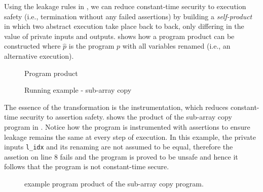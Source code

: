 
Using the leakage rules in , 
we can reduce constant-time security to execution safety (i.e., termination
without any failed assertions) by building a \emph{self-product} in which two
abstract execution take place back to back, only differing in the value of
private inputs and outputs.  shows how a program product can
be constructed where $\hat{p}$ is the program $p$ with all variables renamed
(i.e., an alternative execution).

\begin{figure}[h]
    \centering
    \label{fig:fig_7}
    \label{fig:fig_8}
    \caption{Program product}
    \label{fig:rules}
\end{figure}

\begin{figure}[t]
    
    \caption{Running example - sub-array copy}
    \label{fig:example}
  \end{figure}

The essence of the transformation is the instrumentation, which reduces 
constant-time security to assertion safety.  shows 
the product of the sub-array copy program in . Notice how
the program is instrumented with assertions to ensure leakage remains the same at
every step of execution. In this example, the private inputs \texttt{l\_idx} and
its renaming are not assumed to be equal, therefore the assetion on line 8 fails
and the program is proved to be unsafe and hence it follows that the program is
not constant-time secure.

\begin{figure}[h]
    
    \caption{example program product of the sub-array copy program.}
    \label{fig:example_prod}
\end{figure}

